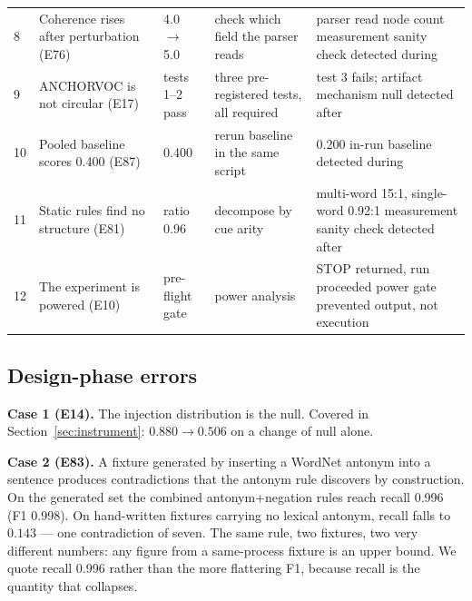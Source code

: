 \documentclass[11pt]{article}
\begin{document}
\begin{longtable}{@{}p{0.5cm}p{4.0cm}p{3.4cm}p{3.0cm}p{3.2cm}@{}}
8 & Coherence rises after perturbation (E76) & 4.0 $\rightarrow$ 5.0 & check which field the parser reads & parser read node count \newline measurement sanity check \newline detected during \\
9 & ANCHORVOC is not circular (E17) & tests 1--2 pass & three pre-registered tests, all required & test 3 fails; artifact \newline mechanism null \newline detected after \\
10 & Pooled baseline scores 0.400 (E87) & 0.400 & rerun baseline in the same script & 0.200 \newline in-run baseline \newline detected during \\
11 & Static rules find no structure (E81) & ratio 0.96 & decompose by cue arity & multi-word 15:1, single-word 0.92:1 \newline measurement sanity check \newline detected after \\
12 & The experiment is powered (E10) & pre-flight gate & power analysis & STOP returned, run proceeded \newline power gate \newline prevented output, not execution \\
\bottomrule
\end{longtable}

\subsection{Design-phase errors}

\textbf{Case 1 (E14).} The injection distribution is the null. Covered in
Section~\ref{sec:instrument}: $0.880 \rightarrow 0.506$ on a change of null
alone.

\textbf{Case 2 (E83).} A fixture generated by inserting a WordNet antonym
into a sentence produces contradictions that the antonym rule discovers by
construction. On the generated set the combined antonym+negation rules
reach recall 0.996 (F1 0.998). On hand-written fixtures carrying no lexical
antonym, recall falls to $0.143$ --- one contradiction of seven. The same
rule, two fixtures, two very different numbers: any figure from a
same-process fixture is an upper bound. We quote recall 0.996 rather than
the more flattering F1, because recall is the quantity that collapses.
\end{document}

